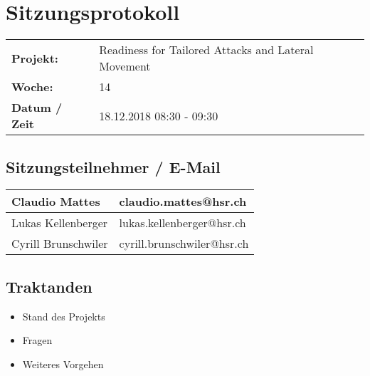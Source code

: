 \newcommand{\TITLE}{Readiness for Tailored Attacks and Lateral Movement Detection}
\newcommand{\REVIEW}{Weekly Meeting}
\newcommand{\VERSION}{0.0}





\section*{Sitzungsprotokoll}

\begin{tabular}{p{4cm} p{12cm}}
    \textbf{Projekt:} & Readiness for Tailored Attacks and Lateral Movement  \\
    \textbf{Woche:} & 14 \\
    \textbf{Datum / Zeit} & 18.12.2018 08:30 - 09:30 \\
\end{tabular}

\subsection*{Sitzungsteilnehmer / E-Mail}
\begin{table}[H]
    \centering
    \begin{tabular}{p{4cm} p{12cm}} \hline
        Claudio Mattes & claudio.mattes@hsr.ch \\ \hline
        Lukas Kellenberger & lukas.kellenberger@hsr.ch \\ \hline
        Cyrill Brunschwiler & cyrill.brunschwiler@hsr.ch \\ \hline
    \end{tabular}
\end{table}

\vspace{1cm}

\subsection*{Traktanden}
\begin{itemize}
    \item Stand des Projekts
    \item Fragen
    \item Weiteres Vorgehen
\end{itemize}

\clearpage


